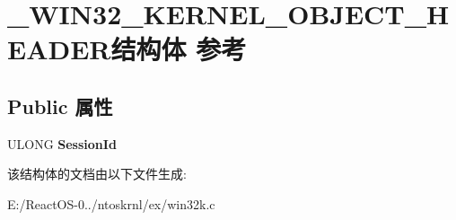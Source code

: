 \hypertarget{struct___w_i_n32___k_e_r_n_e_l___o_b_j_e_c_t___h_e_a_d_e_r}{}\section{\+\_\+\+W\+I\+N32\+\_\+\+K\+E\+R\+N\+E\+L\+\_\+\+O\+B\+J\+E\+C\+T\+\_\+\+H\+E\+A\+D\+E\+R结构体 参考}
\label{struct___w_i_n32___k_e_r_n_e_l___o_b_j_e_c_t___h_e_a_d_e_r}
\subsection*{Public 属性}
\begin{DoxyCompactItemize}
\item 
\mbox{\label{struct___w_i_n32___k_e_r_n_e_l___o_b_j_e_c_t___h_e_a_d_e_r_a607854b5398e1a154bbfac1ca4a992bf}} 
U\+L\+O\+NG {\bfseries Session\+Id}
\end{DoxyCompactItemize}


该结构体的文档由以下文件生成\+:\begin{DoxyCompactItemize}
\item 
E\+:/\+React\+O\+S-\/0../ntoskrnl/ex/win32k.\+c\end{DoxyCompactItemize}
